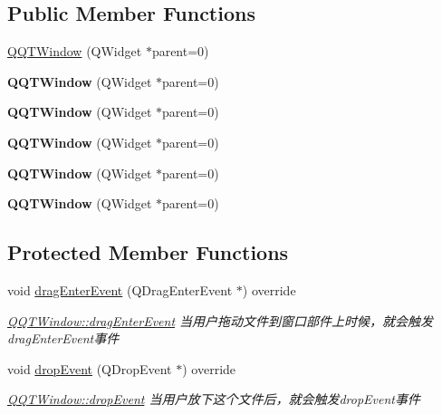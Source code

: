 \subsection*{Public Member Functions}
\begin{DoxyCompactItemize}
\item 
\mbox{\hyperlink{class_q_q_t_window_a0c8953e11e38b95f5f57225455a1e951}{Q\+Q\+T\+Window}} (Q\+Widget $\ast$parent=0)
\item 
\mbox{\label{class_q_q_t_window_a0c8953e11e38b95f5f57225455a1e951}} 
{\bfseries Q\+Q\+T\+Window} (Q\+Widget $\ast$parent=0)
\item 
\mbox{\label{class_q_q_t_window_a0c8953e11e38b95f5f57225455a1e951}} 
{\bfseries Q\+Q\+T\+Window} (Q\+Widget $\ast$parent=0)
\item 
\mbox{\label{class_q_q_t_window_a0c8953e11e38b95f5f57225455a1e951}} 
{\bfseries Q\+Q\+T\+Window} (Q\+Widget $\ast$parent=0)
\item 
\mbox{\label{class_q_q_t_window_a0c8953e11e38b95f5f57225455a1e951}} 
{\bfseries Q\+Q\+T\+Window} (Q\+Widget $\ast$parent=0)
\item 
\mbox{\label{class_q_q_t_window_a0c8953e11e38b95f5f57225455a1e951}} 
{\bfseries Q\+Q\+T\+Window} (Q\+Widget $\ast$parent=0)
\end{DoxyCompactItemize}
\subsection*{Protected Member Functions}
\begin{DoxyCompactItemize}
\item 
\mbox{\label{class_q_q_t_window_a2d71a6e84e3c097fbed032949e02c672}} 
void \mbox{\hyperlink{class_q_q_t_window_a2d71a6e84e3c097fbed032949e02c672}{drag\+Enter\+Event}} (Q\+Drag\+Enter\+Event $\ast$) override
\begin{DoxyCompactList}\small\item\em \mbox{\hyperlink{class_q_q_t_window_a2d71a6e84e3c097fbed032949e02c672}{Q\+Q\+T\+Window\+::drag\+Enter\+Event}} 当用户拖动文件到窗口部件上时候，就会触发drag\+Enter\+Event事件 \end{DoxyCompactList}\item 
void \mbox{\hyperlink{class_q_q_t_window_af1c609c5ba8f3862442c3d1bced11fb4}{drop\+Event}} (Q\+Drop\+Event $\ast$) override
\begin{DoxyCompactList}\small\item\em \mbox{\hyperlink{class_q_q_t_window_af1c609c5ba8f3862442c3d1bced11fb4}{Q\+Q\+T\+Window\+::drop\+Event}} 当用户放下这个文件后，就会触发drop\+Event事件 \end{DoxyCompactList}\end{DoxyCompactItemize}


